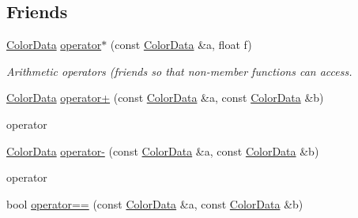\subsection*{Friends}
\begin{DoxyCompactItemize}
\item 
\hyperlink{classimage__tools_1_1ColorData}{Color\+Data} \hyperlink{classimage__tools_1_1ColorData_adf9a770243996e50282d248a4327f351}{operator$\ast$} (const \hyperlink{classimage__tools_1_1ColorData}{Color\+Data} \&a, float f)\hypertarget{classimage__tools_1_1ColorData_adf9a770243996e50282d248a4327f351}{}\label{classimage__tools_1_1ColorData_adf9a770243996e50282d248a4327f351}

\begin{DoxyCompactList}\small\item\em Arithmetic operators (friends so that non-\/member functions can access. \end{DoxyCompactList}\item 
\hyperlink{classimage__tools_1_1ColorData}{Color\+Data} \hyperlink{classimage__tools_1_1ColorData_afee00faf26189979b72f3854a17200ae}{operator+} (const \hyperlink{classimage__tools_1_1ColorData}{Color\+Data} \&a, const \hyperlink{classimage__tools_1_1ColorData}{Color\+Data} \&b)\hypertarget{classimage__tools_1_1ColorData_afee00faf26189979b72f3854a17200ae}{}\label{classimage__tools_1_1ColorData_afee00faf26189979b72f3854a17200ae}

\begin{DoxyCompactList}\small\item\em 
\begin{DoxyItemize}
\item operator 
\end{DoxyItemize}\end{DoxyCompactList}\item 
\hyperlink{classimage__tools_1_1ColorData}{Color\+Data} \hyperlink{classimage__tools_1_1ColorData_a799bd54f65a61569b5b968062ac0d37e}{operator-\/} (const \hyperlink{classimage__tools_1_1ColorData}{Color\+Data} \&a, const \hyperlink{classimage__tools_1_1ColorData}{Color\+Data} \&b)\hypertarget{classimage__tools_1_1ColorData_a799bd54f65a61569b5b968062ac0d37e}{}\label{classimage__tools_1_1ColorData_a799bd54f65a61569b5b968062ac0d37e}

\begin{DoxyCompactList}\small\item\em 
\begin{DoxyItemize}
\item operator 
\end{DoxyItemize}\end{DoxyCompactList}\item 
bool \hyperlink{classimage__tools_1_1ColorData_a9dae9e77610393d100312c9d248f09cc}{operator==} (const \hyperlink{classimage__tools_1_1ColorData}{Color\+Data} \&a, const \hyperlink{classimage__tools_1_1ColorData}{Color\+Data} \&b)\hypertarget{classimage__tools_1_1ColorData_a9dae9e77610393d100312c9d248f09cc}{}\label{classimage__tools_1_1ColorData_a9dae9e77610393d100312c9d248f09cc}


\end{DoxyCompactItemize}
